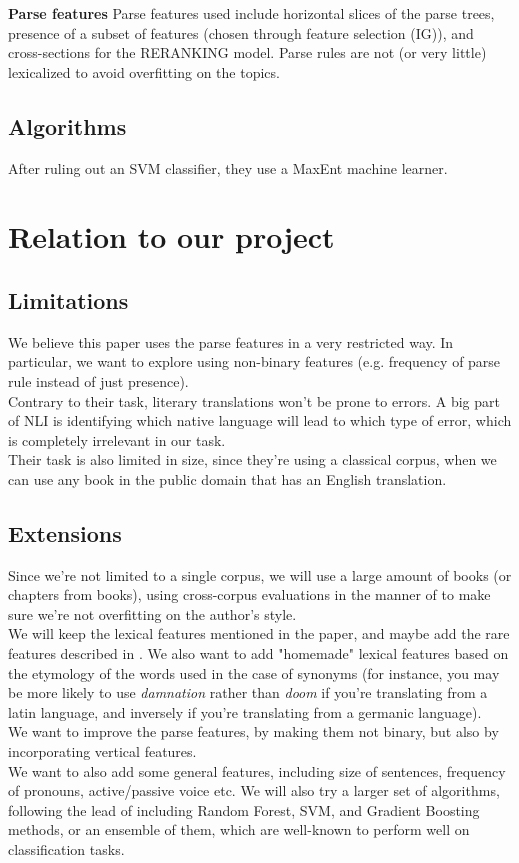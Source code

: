 \documentclass[10pt]{article}
\begin{document}
\textbf{Parse features}
Parse features used include horizontal slices of the parse trees, presence of a subset of features (chosen through feature selection (IG)), and cross-sections for the RERANKING model.
Parse rules are not (or very little) lexicalized to avoid overfitting on the topics.

\subsection*{Algorithms}
After ruling out an SVM classifier, they use a MaxEnt machine learner.
\section{Relation to our project}
\subsection{Limitations}
We believe this paper uses the parse features in a very restricted way. In particular, we want to explore using non-binary features (e.g. frequency of parse rule instead of just presence). \\
Contrary to their task, literary translations won't be prone to errors. A big part of NLI is identifying which native language will lead to which type of error, which is completely irrelevant in our task. \\
Their task is also limited in size, since they're using a classical corpus, when we can use any book in the public domain that has an English translation.

\subsection{Extensions}
Since we're not limited to a single corpus, we will use a large amount of books (or chapters from books), using cross-corpus evaluations in the manner of \cite{brooke2012robust} to make sure we're not overfitting on the author's style. \\
We will keep the lexical features mentioned in the paper, and maybe add the rare features described in \cite{brooke2012measuring}. We also want to add "homemade" lexical features based on the etymology of the words used in the case of synonyms (for instance, you may be more likely to use \emph{damnation} rather than \emph{doom} if you're translating from a latin language, and inversely if you're translating from a germanic language). \\
We want to improve the parse features, by making them not binary, but also by incorporating vertical features. \\
We want to also add some general features, including size of sentences, frequency of pronouns, active/passive voice etc.
We will also try a larger set of algorithms, following the lead of \cite{tetreault2013report} including Random Forest, SVM, and Gradient Boosting methods, or an ensemble of them, which are well-known to perform well on classification tasks.
\end{document}
